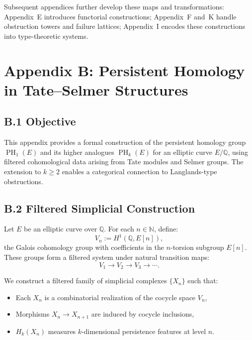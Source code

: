 \documentclass[11pt]{article}
\DeclareMathOperator{\PH}{PH}
\newcommand{\QQ}{\mathbb{Q}}
\begin{document}
Subsequent appendices further develop these maps and transformations:  
Appendix~E introduces functorial constructions; Appendix~F and~K handle obstruction towers and failure lattices; Appendix~I encodes these constructions into type-theoretic systems.




\section*{Appendix B: Persistent Homology in Tate--Selmer Structures}

\subsection*{B.1 Objective}

This appendix provides a formal construction of the persistent homology group $\PH_1(E)$ and its higher analogues $\PH_k(E)$ for an elliptic curve $E/\QQ$, using filtered cohomological data arising from Tate modules and Selmer groups. The extension to $k \geq 2$ enables a categorical connection to Langlands-type obstructions.

\subsection*{B.2 Filtered Simplicial Construction}

Let $E$ be an elliptic curve over $\QQ$. For each $n \in \mathbb{N}$, define:
\[
V_n := H^1(\QQ, E[n]),
\]
the Galois cohomology group with coefficients in the $n$-torsion subgroup $E[n]$. These groups form a filtered system under natural transition maps:
\[
V_1 \to V_2 \to V_3 \to \cdots.
\]

We construct a filtered family of simplicial complexes $\{X_n\}$ such that:
\begin{itemize}
  \item Each $X_n$ is a combinatorial realization of the cocycle space $V_n$,
  \item Morphisms $X_n \to X_{n+1}$ are induced by cocycle inclusions,
  \item $H_k(X_n)$ measures $k$-dimensional persistence features at level $n$.
\end{itemize}
\end{document}
